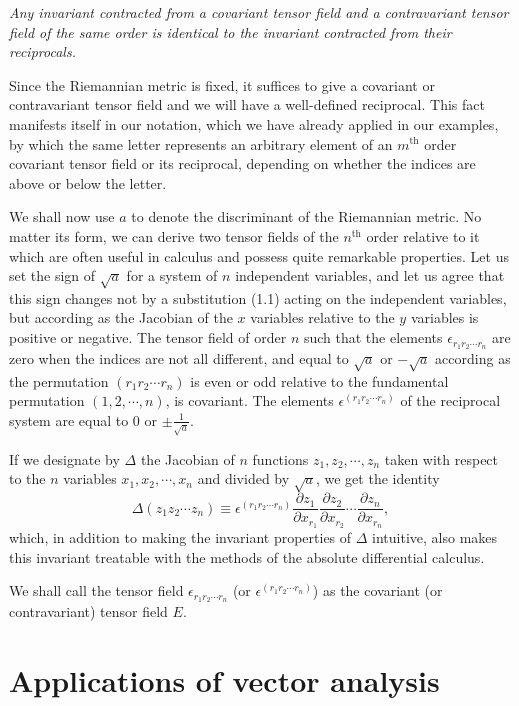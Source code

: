 \documentclass{book}
\begin{document}
\emph{Any invariant contracted from a covariant tensor field and a contravariant tensor field of the same order is identical to the invariant contracted from their reciprocals.}

Since the Riemannian metric is fixed, it suffices to give a covariant or contravariant tensor field and we will have a well-defined reciprocal. This fact manifests itself in our notation, which we have already applied in our examples, by which the same letter represents an arbitrary element of an $m^{\text{th}}$ order covariant tensor field or its reciprocal, depending on whether the indices are above or below the letter.

We shall now use $a$ to denote the discriminant of the Riemannian metric. No matter its form, we can derive two tensor fields of the $n^{\text{th}}$ order relative to it which are often useful in calculus and possess quite remarkable properties. Let us set the sign of $\sqrt{a}$ for a system of $n$ independent variables, and let us agree that this sign changes not by a substitution (1.1) acting on the independent variables, but according as the Jacobian of the $x$ variables relative to the $y$ variables is positive or negative. The tensor field of order $n$ such that the elements $\epsilon_{r_1r_2\cdots r_n}$ are zero when the indices are not all different, and equal to $\sqrt{a}$ or $-\sqrt{a}$ according as the permutation $(r_1r_2\cdots r_n)$ is even or odd relative to the fundamental permutation $(1,2,\cdots,n)$, is covariant. The elements $\epsilon^{(r_1r_2\cdots r_n)}$ of the reciprocal system are equal to $0$ or $\pm\frac{1}{\sqrt{a}}$.

If we designate by $\Delta$ the Jacobian of $n$ functions $z_1,z_2,\cdots,z_n$ taken with respect to the $n$ variables $x_1,x_2,\cdots,x_n$ and divided by $\sqrt{a}$, we get the identity
$$\Delta(z_1z_2\cdots z_n)\equiv\epsilon^{(r_1r_2\cdots r_n)}\frac{\partial z_1}{\partial x_{r_1}}\frac{\partial z_2}{\partial x_{r_2}}\cdots\frac{\partial z_n}{\partial x_{r_n}},$$
which, in addition to making the invariant properties of $\Delta$ intuitive, also makes this invariant treatable with the methods of the absolute differential calculus. 

We shall call the tensor field $\epsilon_{r_1r_2\cdots r_n}$ (or $\epsilon^{(r_1r_2\cdots r_n)}$) as the covariant (or contravariant) tensor field $E$.

\section{Applications of vector analysis}
\end{document}
